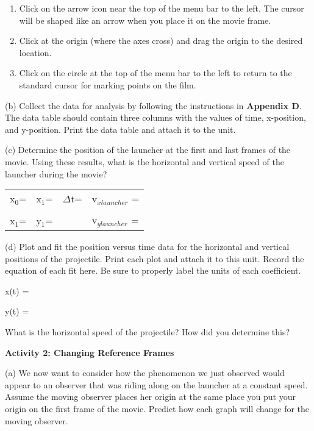 \begin{enumerate}
\item Click on the arrow icon near the top of the menu bar to the left.
The cursor will be shaped like an arrow when you place it on the movie
frame.
\item Click at the origin (where the axes cross) and drag the origin to
the desired location.
\item Click on the circle at the top of the menu bar to the left to return
to the standard cursor for marking points on the film.
\end{enumerate}
(b) Collect the data for analysis by following the instructions in
\textbf{Appendix D}. The data table should contain three columns with
the values of time, x-position, and y-position. Print the data table
and attach it to the unit.

(c) Determine the position of the launcher at the first and last frames
of the movie. Using these results, what is the horizontal and vertical
speed of the launcher during the movie?

\vspace{0.3cm}
{\centering \begin{tabular}{p{20mm}p{20mm}p{30mm}p{70mm}}
x\( _{0} \)= &
x\( _{1} \)=&
\( \Delta  \)t=&
v\( _{xlauncher} \) =\\
&
&
&
\\
x\( _{1} \)=&
y\( _{1} \)= &
&
v\( _{ylauncher} \) =\\
\end{tabular}\par}
\vspace{0.3cm}

(d) Plot and fit the position versus time data for the horizontal
and vertical positions of the projectile. Print each
plot and attach it to this unit. Record the equation of each fit here.
Be sure to properly label the units of each coefficient.

x(t) =
\vspace*{5mm}

y(t) =
\vspace{5mm}

What is the horizontal speed of the projectile? How did you determine
this?
\vspace{2in}

\textbf{Activity 2: Changing Reference Frames}

(a) We now want to consider how the phenomenon we just observed would
appear to an observer that was riding along on the launcher at a constant
speed. Assume the moving observer places her origin at the same place
you put your origin on the first frame of the movie. Predict how each
graph will change for the moving observer.

